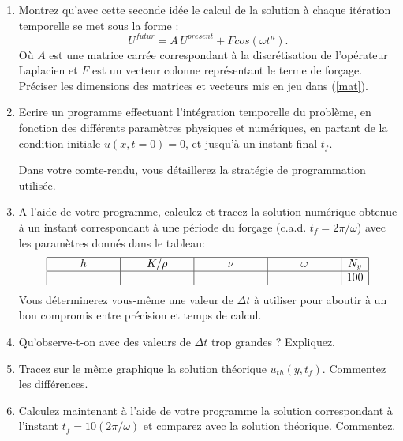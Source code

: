 \documentclass[a4,12pt]{article}
\begin{document}
\begin{enumerate}
\item Montrez qu'avec cette seconde idée le calcul de la solution à chaque itération temporelle se met sous la forme :
\begin{equation}
\label{mat}
U^{futur} =A\, U^{present} +F cos(\omega t^{n}).
\end{equation}
\noindent
Où $A$ est une matrice carrée correspondant 
\`a la discr\'etisation de l'op\'erateur Laplacien et $F$ est un vecteur colonne 
repr\'esentant le terme de for\c{c}age. Pr\'eciser les dimensions des
matrices et vecteurs mis en jeu dans (\ref{mat}). 

\item Ecrire un programme effectuant l'intégration temporelle du problème,
en fonction des différents paramètres physiques et numériques,
en partant de la condition initiale $u(x,t=0) = 0$, et jusqu'à un instant final $t_f$.


Dans votre comte-rendu, vous détaillerez la stratégie de programmation utilisée.

\item A l'aide de votre programme, calculez et tracez la solution numérique obtenue 
à un instant correspondant à {\color{red} une période du forçage (c.a.d. $t_f = 2\pi / \omega$)}
avec les paramètres donnés dans le tableau:
$$
\begin{array}{|c|c|c|c|c|}
\hline
h & K/\rho & \nu & \omega & N_y \\
\hline
\hspace{2cm} & \hspace{2cm} & \hspace{2cm} & \hspace{2cm} & 100 \\
\hline
\end{array}
$$
Vous déterminerez vous-même une valeur de $\Delta t$ à utiliser pour aboutir
à un bon compromis entre précision et temps de calcul.


\item Qu'observe-t-on avec des valeurs de $\Delta t$ trop grandes ? Expliquez.

\item Tracez sur le même graphique la solution théorique $u_{th}(y,t_f)$.
Commentez les différences.

\item Calculez maintenant à l'aide de votre programme la solution 
correspondant à l'instant {\color{red} $t_f = 10 (2\pi /\omega)$} et comparez avec la solution théorique. Commentez.



\end{enumerate}
\end{document}
